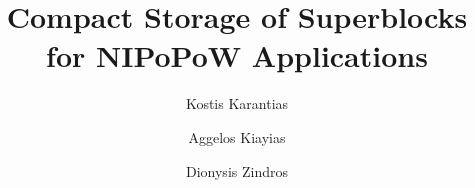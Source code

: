 \title{Compact Storage of Superblocks\\for NIPoPoW Applications}

\ifanonymous
   \author{}
   \institute{}
\else
   \author{
           Kostis Karantias  \and
           Aggelos Kiayias  \and
           Dionysis Zindros 
   }
\fi
\maketitle
